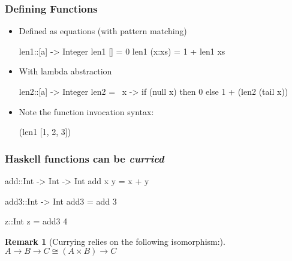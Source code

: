 \documentclass{beamer}
\newtheorem{remark}{Remark}
\begin{document}
\begin{frame}[fragile]
    \frametitle{Defining Functions}
\begin{itemize}

\item Defined as equations (with pattern matching)
{\color{red}
\begin{newcode}
len1::[a] -> Integer
len1 [] = 0
len1 (x:xs) = 1 + len1 xs
\end{newcode}
}
\pause

\item With lambda abstraction
{\color{red}
\begin{newcode}
len2::[a] -> Integer
len2 = \ x -> if (null x) then 0 else 1 + (len2 (tail x))
\end{newcode}
}

\pause
\item Note the function invocation syntax:
{\color{red}
\begin{newcode}
(len1 [1, 2, 3])
\end{newcode}
}

\end{itemize}
\end{frame}


\begin{frame}[fragile]
    \frametitle{Haskell functions can be \emph{curried}}
{\large
    {\color{red}
    \begin{newcode}
    add::Int -> Int -> Int
    add x y = x + y
    
    add3::Int -> Int
    add3 = add 3
    
    z::Int
    z = add3 4
    \end{newcode}
    }
}
\begin{remark}[Currying relies on the following isomorphism:]
\(A \rightarrow B \rightarrow C  \cong (A \times B) \rightarrow C \)
\end{remark}

\end{frame}
\end{document}
